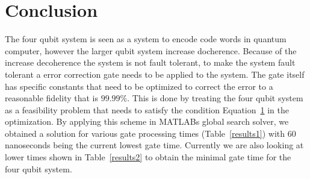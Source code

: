 \section{Conclusion}

The four qubit system is seen as a system to encode code words in quantum computer, however the larger qubit system increase docherence. Because of the increase decoherence the system is not fault tolerant, to make the system fault tolerant a error correction gate needs to be applied to the system. The gate itself has specific constants that need to be optimized to correct the error to a reasonable fidelity that is $99.99\%$. This is done by treating the four qubit system
as a feasibility problem that needs to satisfy the condition Equation~\ref{} in the optimization. By applying this scheme in MATLABs global search solver, we obtained a solution for various gate processing times (Table~\ref{results1}) with $60$ nanoseconds being the current lowest gate time. Currently we are also looking at lower times shown in Table~\ref{results2} to obtain the minimal gate time for the four qubit system. 
